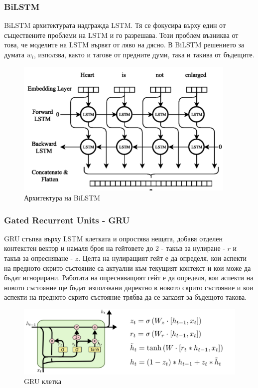 \documentclass{article}
\begin{document}
    \subsubsection{BiLSTM}

    BiLSTM архитектурата надгражда LSTM. Тя се фокусира върху един от съществените проблеми на LSTM и го разрешава. Този
    проблем възниква от това, че моделите на LSTM вървят от ляво на дясно. В BiLSTM решението за думата $w_i$, използва,
    както и тагове от предните думи, така и такива от бъдещите. \cite{intro-to-nlp-stanford}

    \begin{figure}[H]
        \centering
        \captionsetup{justification=centering}
        \includegraphics[width=400px, keepaspectratio]{chapter-03/bi-lstm.png}
        \caption{Архитектура на BiLSTM}
    \end{figure}

    \subsubsection{Gated Recurrent Units - GRU}

    GRU стъпва върху LSTM клетката и опростява нещата, добавя отделен контекстен вектор и намаля броя на гейтовете до 2 -
    такъв за нулиране - $r$ и такъв за опресняване - $z$. Целта на нулиращият гейт е да определя, кои аспекти на предното
    скрито състояние са актуални към текущият контекст и кои може да бъдат игнорирани. Работата на опресняващият гейт е да
    определя, кои аспекти на новото състояние ще бъдат използвани директно в новото скрито състояние и кои аспекти на
    предното скрито състояние трябва да се запазят за бъдещото такова. \cite{intro-to-nlp-stanford}

    \begin{figure}[H]
        \centering
        \captionsetup{justification=centering}
        \includegraphics[width=450px, keepaspectratio]{chapter-03/gru.png}
        \caption{GRU клетка}
    \end{figure}
\end{document}
